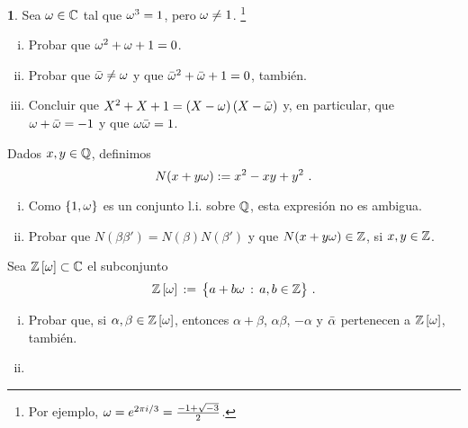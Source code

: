 \theoremstyle{definition}
\newtheorem{ejerEuclidianos}{\ejername}[section]


\begin{ejerEuclidianos}\label{ejer:euclidianos:eisenstein}
	Sea $\omega\in\mathbb{C}$ tal que $\omega^3=1$, pero
	$\omega\neq 1$.%
	\footnote{
		Por ejemplo, $\omega=e^{2\pi i/3}=\frac{-1+\sqrt{-3}} 2$.
	}
	\begin{enumerate}[(i)]
		\item\label{ejer:euclidianos:eisenstein:pre:i}
			Probar que $\omega^2+\omega+1=0$.
		\item\label{ejer:euclidianos:eisenstein:pre:ii}
			Probar que $\bar{\omega}\neq\omega$ y que
			$\bar{\omega}^2+\bar{\omega}+1=0$, tambi\'en.
		\item\label{ejer:euclidianos:eisenstein:pre:iii}
			Concluir que
			$X^2+X+1=(X-\omega)\,(X-\bar{\omega})$ y,
			en particular, que $\omega+\bar{\omega}=-1$
			y que $\omega\bar{\omega}=1$.
	\end{enumerate}
	Dados $x,y\in\mathbb{Q}$, definimos
	\begin{displaymath}
		N(x+y\omega):=x^2-xy+y^2
		\text{ .}
	\end{displaymath}
	\begin{enumerate}[(i)]
		\item\label{item:ejer:euclidianos:eisenstein:norma:i}
			Como $\{1,\omega\}$ es un conjunto l.i. sobre
			$\mathbb{Q}$, esta expresi\'on no es ambigua.
		\item\label{item:ejer:euclidianos:eisenstein:norma:i}
			Probar que $N(\beta\beta')=N(\beta)N(\beta')$ y
			que $N(x+y\omega)\in\mathbb{Z}$, si
			$x,y\in\mathbb{Z}$.
	\end{enumerate}
	Sea ${\mathbb{Z}}\left[\omega\right]\subset\mathbb{C}$ el subconjunto
	\begin{displaymath}
		{\ensuremath{\mathbb{Z}}}\left[\omega\right]\,:=\,\big\{
			a+b\omega\,:\,a,b\in\mathbb{Z}\big\}
		\text{ .}
	\end{displaymath}
	\begin{enumerate}[(i)]
		\item\label{item:ejer:euclidianos:eisenstein:enteros:i}
			Probar que, si $\alpha,\beta\in{\ensuremath{\mathbb{Z}}}\left[\omega\right]$,
			entonces $\alpha+\beta$, $\alpha\beta$, $-\alpha$ y
			$\bar{\alpha}$ pertenecen a ${\mathbb{Z}}\left[\omega\right]$,
			tambi\'en.
		\item\label{item:ejer:euclidianos:eisenstein:enteros:ii}

\end{enumerate}
\end{ejerEuclidianos}
